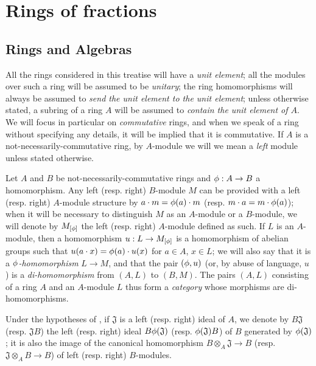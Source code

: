 \section{Rings of fractions}
\label{section:0.1}

\setcounter{subsection}{-1}
\subsection{Rings and Algebras}
\label{subsection:0.1.0}

\begin{env}[1.0.1]
\label{0.1.0.1}
All the rings considered in this treatise will have a \emph{unit element};
all the modules over such a ring will be assumed to be \emph{unitary};
the ring homomorphisms will always be assumed to \emph{send the unit element to the unit element};
unless otherwise stated, a subring of a ring $A$ will be assumed to \emph{contain the unit element of $A$}.
We will focus in particular on \emph{commutative} rings, and when we speak of a ring without specifying any details, it will be implied that it is commutative.
If $A$ is a not-necessarily-commutative ring, by $A$-module we will we mean a \emph{left} module unless stated otherwise.
\end{env}

\begin{env}[1.0.2]
\label{0.1.0.2}
Let $A$ and $B$ be not-necessarily-commutative rings and $\vphi:A\to B$ a homomorphism.
Any left (resp. right) $B$-module $M$ can be provided with a left (resp. right) $A$-module structure by $a\cdot m=\phi(a)\cdot m$ (resp. $m\cdot a=m\cdot\phi(a)$);
when it will be necessary to distinguish $M$ as an $A$-module or a $B$-module, we will denote by $M_{[\phi]}$ the left (resp. right) $A$-module defined as such.
If $L$ is an $A$-module, then a homomorphism $u:L\to M_{[\vphi]}$ is a homomorphism of abelian groups such that $u(a\cdot x)=\phi(a)\cdot u(x)$ for $a\in A$, $x\in L$;
we will also say that it is a \emph{$\phi$-homomorphism} $L\to M$, and that the pair $(\phi,u)$ (or, by abuse of language, $u$) is a \emph{di-homomorphism} from $(A,L)$ to $(B,M)$.
The pairs $(A,L)$ consisting of a ring $A$ and an $A$-module $L$ thus form a \emph{category} whose morphisms are di-homomorphisms.
\end{env}

\begin{env}[1.0.3]
\label{0.1.0.3}
Under the hypotheses of , if $\mathfrak{J}$ is a left (resp. right) ideal of $A$, we denote by $B\mathfrak{J}$ (resp. $\mathfrak{J}B$) the left (resp. right) ideal $B\phi(\mathfrak{J})$ (resp. $\phi(\mathfrak{J})B$) of $B$ generated by $\phi(\mathfrak{J})$;
it is also the image of the canonical homomorphism $B\otimes_A\mathfrak{J}\to B$ (resp. $\mathfrak{J}\otimes_A B\to B$) of left (resp. right) $B$-modules.
\end{env}

